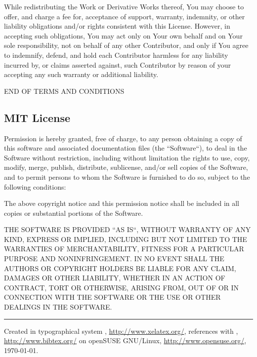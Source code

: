 \documentclass[a4paper, 11pt, twoside]{article}
\begin{document}
While redistributing the Work or Derivative Works thereof, You may choose to offer, and charge a fee for, acceptance of support, warranty, indemnity, or other liability obligations and/or rights consistent with this License. However, in accepting such obligations, You may act only on Your own behalf and on Your sole responsibility, not on behalf of any other Contributor, and only if You agree to indemnify, defend, and hold each Contributor harmless for any liability incurred by, or claims asserted against, such Contributor by reason of your accepting any such warranty or additional liability.

END OF TERMS AND CONDITIONS

\subsection{MIT License}

Permission is hereby granted, free of charge, to any person obtaining a copy of this software and associated documentation files (the “Software“), to deal in the Software without restriction, including without limitation the rights to use, copy, modify, merge, publish, distribute, sublicense, and/or sell copies of the Software, and to permit persons to whom the Software is furnished to do so, subject to the following conditions:

The above copyright notice and this permission notice shall be included in all copies or substantial portions of the Software.

THE SOFTWARE IS PROVIDED “AS IS“, WITHOUT WARRANTY OF ANY KIND, EXPRESS OR IMPLIED, INCLUDING BUT NOT LIMITED TO THE WARRANTIES OF MERCHANTABILITY, FITNESS FOR A PARTICULAR PURPOSE AND NONINFRINGEMENT. IN NO EVENT SHALL THE AUTHORS OR COPYRIGHT HOLDERS BE LIABLE FOR ANY CLAIM, DAMAGES OR OTHER LIABILITY, WHETHER IN AN ACTION OF CONTRACT, TORT OR OTHERWISE, ARISING FROM, OUT OF OR IN CONNECTION WITH THE SOFTWARE OR THE USE OR OTHER DEALINGS IN THE SOFTWARE.

\endgroup



\vfill
\hrule
\vfill
\begin{tiny}
  Created in typographical system \XeLaTeX, \href{http://www.xelatex.org/}{http://www.xelatex.org/}, references with \BibTeX, \href{http://www.bibtex.org/}{http://www.bibtex.org/} on openSUSE GNU/Linux, \href{http://www.opensuse.org/}{http://www.opensuse.org/}, \today.
\end{tiny}
\end{document}
